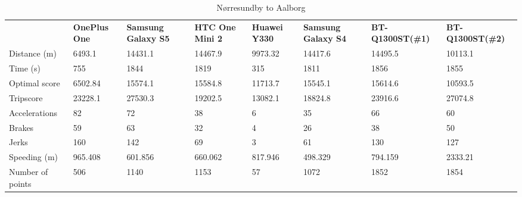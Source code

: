 \begin{table*}[tb]
\centering
\caption{Nørresundby to Aalborg}
\label{my-label}
\begin{tabular}{|l|lllllll|}
\hline
\rowcolor{tablegreen}

                 & \textbf{OnePlus One} & \textbf{Samsung Galaxy S5} & \textbf{HTC One Mini 2} & \textbf{Huawei Y330} & \textbf{Samsung Galaxy S4} & \textbf{BT-Q1300ST(\#1)} & \textbf{BT-Q1300ST(\#2)} \\
Distance (m)     & 6493.1      & 14431.1           & 14467.9        & 9973.32     & 14417.6           & 14495.5         & 10113.1         \\
Time (s)         & 755         & 1844              & 1819           & 315         & 1811              & 1856            & 1855            \\
Optimal score    & 6502.84     & 15574.1           & 15584.8        & 11713.7     & 15545.1           & 15614.6         & 10593.5         \\
Tripscore        & 23228.1     & 27530.3           & 19202.5        & 13082.1     & 18824.8           & 23916.6         & 27074.8         \\
Accelerations    & 82          & 72                & 38             & 6           & 35                & 66              & 60              \\
Brakes           & 59          & 63                & 32             & 4           & 26                & 38              & 50              \\
Jerks            & 160         & 142               & 69             & 3           & 61                & 130             & 127             \\
Speeding (m)     & 965.408     & 601.856           & 660.062        & 817.946     & 498.329           & 794.159         & 2333.21         \\
Number of points & 506         & 1140              & 1153           & 57          & 1072              & 1852            & 1854      \\\hline     

\end{tabular}
\end{table*}
